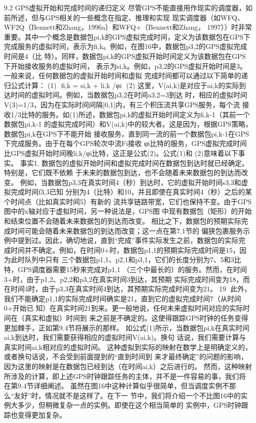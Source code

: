 9.2 GPS虚拟开始和完成时间的递归定义
尽管GPS不能直接用作现实的调度器，如前所述，但与GPS相关的一些概念在指定、推理和实现
现实调度器（如WFQ、WF2Q（Bennett和Zhang，1996a）和WFQ+（Bennett和Zhang，
1997））时非常重要。其中一个概念是数据包pi,k的GPS虚拟完成时间，定义为该数据包在GPS下
完成服务的虚拟时间，表示为fi,k。例如，在图16中，数据包p3,2的GPS虚拟完成时间是4（比
特）。同样，数据包pi,k的GPS虚拟开始时间定义为该数据包在GPS下开始接收服务的虚拟时间，
表示为si,k。例如，p3,2的GPS虚拟开始时间是3。一般来说，任何数据包的虚拟开始时间和虚拟
完成时间都可以通过以下简单的递归公式计算：
                                           (1)
                  ​ fi,k = si,k + li,k /φi
                       ​   ​   ​            (2)
这里，V(ai,k)是对应于ai,k的实际到达时间的虚拟时间。例如，当数据包p3,2在时间a3,2=3到达
时，相应的虚拟时间V(3)=1/3，因为在实际时间间隔[0,1]内，有三个积压流共享GPS服务，每个流
接收1/3比特的服务。如(1)所述，数据包pi,k的虚拟开始时间定义为fi,k-1（其前一个数据包pi,k-1
的虚拟完成时间）和V(ai,k)中的较大者。这是因为，根据GPS策略，数据包pi,k在GPS下不能开始
接收服务，直到同一流的前一个数据包pi,k-1在GPS下完成服务。由于在每个GPS轮次中流Fi接收
φi比特的服务，GPS虚拟完成时间比GPS虚拟开始时间晚li,k/φi比特，这正是公式(2)。公式(1)和
(2)意味着以下事实。
事实1. 数据包的虚拟开始时间和虚拟完成时间在数据包到达时就已经确定。特别是，它们既不依赖
于未来的数据包到达，也不会随着未来数据包的到达而改变。
例如，当数据包p3,3在真实时间4（秒）到达时，它的虚拟开始时间s3,3和虚拟完成时间f3,3已知
分别为4（比特）和10，并且即使在真实时间4（秒）之后的某个时间点（比如真实时间5）有新的
流共享链路带宽，它们也保持不变。由于GPS图中的x轴对应于虚拟时间，另一种说法是，GPS图
中现有数据包（矩形）的开始和结束位置不会随着未来数据包的到达而改变。
相比之下，数据包的预期实际完成时间可能会随着未来数据包的到达而改变；这一点在第7.1节的
偏狭包裹服务示例中提到过。因此，确切地说，直到“完成”事件实际发生之前，数据包的实际完
成时间并不确定。例如，在时间0+时，数据包p1,1的预期实际完成时间是15，因为此时队列中只有
三个数据包p1,1、p2,1和p3,1，它们的长度分别为7、5和3比特，GPS调度器需要15秒来完成对p1,1
（三个中最长的）的服务。然而，在时间3+时，由于p1,2、p2,2和p3,2在真实时间3到达，其预期
实际完成时间变为18，而在时间4时，由于p3,3在真实时间4到达，其预期实际完成时间变为21。
                                                      19
此外，我们不能确定p1,1的实际完成时间确实是21，直到它的虚拟完成时间7（从时间0+开始已
知）在真实时间21到来。更一般地说，任何未来虚拟时间对应的实际时间在（真实和虚拟）时间到
来之前是不确定的。这使得跟踪GPS时钟的任务变得更加棘手，正如第9.4节将展示的那样。
如公式(1)所示，当数据包pi,k在真实时间ai,k到达时，我们需要获得相应的虚拟时间V(ai,k)。换句
话说，我们需要计算与真实时间ai,k相对应的虚拟时间。
这种虚拟到实际的映射在数学上是明确定义的，或者换句话说，不会受到前面提到的“直到时间到
来才最终确定”的问题的影响，因为这里的映射是在数据包已经到达（在时间ai,k）之后进行的。
然而，这种映射所涉及的计算，即上述GPS时钟跟踪任务的主体，并不是一件容易的事，我们将
在第9.4节详细阐述。
虽然在图16中这种计算似乎很简单，但当调度实例不那么“友好”时，情况就不是这样了。在下一
节中，我们将介绍一个不比图16中的实例大多少，但稍微复杂一点的实例。即使在这个相当简单的
实例中，GPS时钟跟踪也变得更加复杂。

